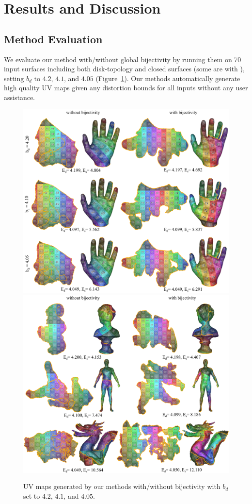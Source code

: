 
\section{Results and Discussion}
\label{sec:results}


\subsection{Method Evaluation}

We evaluate our method with/without global bijectivity by running them on 70 input surfaces including both disk-topology and closed surfaces (some are with ), setting $b_d$ to $4.2$, $4.1$, and $4.05$ (Figure~\ref{fig:our_impressive_results}). Our methods automatically generate high quality UV maps given any distortion bounds for all inputs without any user assistance.

\begin{figure}[!h]
\centering
\includegraphics[width=0.48\linewidth]{fig/our_impressive_results_left.png}
\includegraphics[width=0.5\linewidth]{fig/our_impressive_results_right.png}
\caption{UV maps generated by our methods with/without bijectivity with $b_d$ set to $4.2$, $4.1$, and $4.05$.}
\label{fig:our_impressive_results}
\end{figure}

